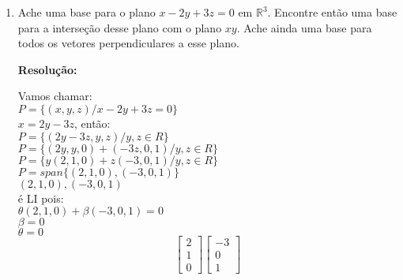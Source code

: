 \documentclass[leqno]{article}
\numberwithin{equation}{section}
\newcommand{\bR}{\mathbb{R}}
\newenvironment{sol}
{
	\vspace{4mm}
	\noindent\textbf{Resolução:}
	\strut\newline
	\smallskip
	\hspace{-3.5mm}
}
{}
\begin{document}
\begin{enumerate}
\begin{sol}
		Essa solução não é válida \textbf{apenas} para $c_1 = c_2 = c_3 = c_4 = 0$ então podemos concluir que $v_1$, $v_2$, $v_3$ e $v_6$ não são LI.
		
		
		Sendo assim, o maior número de vetores LI entre eles é 3.
		\end{sol} 
		
		\item Ache uma base para o plano $x - 2y + 3z = 0$ em $\bR^3$. Encontre então uma base para a interseção desse plano com o plano $xy$. Ache ainda uma base para todos os vetores perpendiculares a esse plano.
		
		\begin{sol} 
			Vamos chamar:\\
			\vspace{0.2cm}
			$P = \{(x, y, z) / x - 2y + 3z = 0\}$\\
			\vspace{0.2cm}
			$x = 2y - 3z$, então:\\
			\vspace{0.2cm}
			$P = \{(2y - 3z, y, z) / y,z \in R\}$\\
			\vspace{0.2cm}
			$P = \{(2y, y, 0) + (-3z, 0, 1) / y, z \in R\}$\\
			\vspace{0.2cm}
			$P = \{y(2, 1, 0) + z(-3, 0, 1) / y, z \in R\}$\\
			\vspace{0.2cm}
			$P = span\{(2,1,0),(-3,0,1)\}$\\
			\vspace{0.2cm}
			$(2, 1, 0), (-3, 0, 1)$\\
			\vspace{0.2cm}
			é LI pois:\\
			\vspace{0.2cm}
			$\theta (2, 1, 0) + \beta(-3,0,1) = 0$\\
			\vspace{0.2cm}
			$\beta = 0$\\
			\vspace{0.2cm}
			$\theta = 0$\\
			$$\begin{bmatrix} 
				2 \\
				1  \\
				0 \end{bmatrix}\begin{bmatrix} 
				-3  \\
				0  \\
				1 \end{bmatrix}$$ 

\end{sol}
\end{enumerate}
\end{document}
